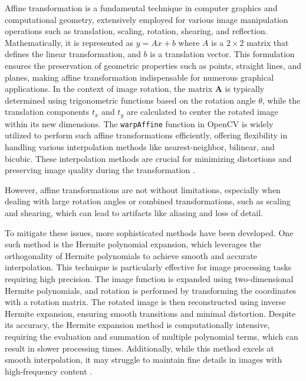 \documentclass[conference]{IEEEtran}
\begin{document}
Affine transformation is a fundamental technique in computer graphics and computational geometry, extensively employed for various image manipulation operations such as translation, scaling, rotation, shearing, and reflection. Mathematically, it is represented as
$ y = Ax + b $ where $A$ is a $2 \times 2$ matrix that defines the linear transformation, and $b$ is a translation vector. This formulation ensures the preservation of geometric properties such as points, straight lines, and planes, making affine transformation indispensable for numerous graphical applications. In the context of image rotation, the matrix $\mathbf{A}$ is typically determined using trigonometric functions based on the rotation angle $\theta$, while the translation components $t_x$ and $t_y$ are calculated to center the rotated image within its new dimensions. The \texttt{warpAffine} function in OpenCV is widely utilized to perform such affine transformations efficiently, offering flexibility in handling various interpolation methods like nearest-neighbor, bilinear, and bicubic. These interpolation methods are crucial for minimizing distortions and preserving image quality during the transformation \cite{wang2021panoramic}.

However, affine transformations are not without limitations, especially when dealing with large rotation angles or combined transformations, such as scaling and shearing, which can lead to artifacts like aliasing and loss of detail. 


To mitigate these issues, more sophisticated methods have been developed. One such method is the Hermite polynomial expansion, which leverages the orthogonality of Hermite polynomials to achieve smooth and accurate interpolation. This technique is particularly effective for image processing tasks requiring high precision. The image function is expanded using two-dimensional Hermite polynomials, and rotation is performed by transforming the coordinates with a rotation matrix. The rotated image is then reconstructed using inverse Hermite expansion, ensuring smooth transitions and minimal distortion. Despite its accuracy, the Hermite expansion method is computationally intensive, requiring the evaluation and summation of multiple polynomial terms, which can result in slower processing times. Additionally, while this method excels at smooth interpolation, it may struggle to maintain fine details in images with high-frequency content \cite{park2009accurate}.
\end{document}
